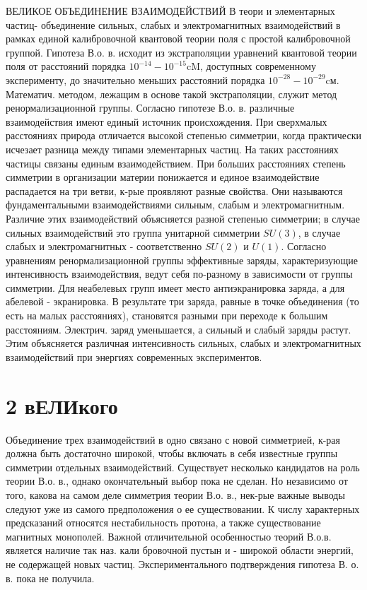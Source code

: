 \documentclass[10pt]{article}
\begin{document}
ВЕЛИКОЕ ОБЪЕДИНЕНИЕ ВЗАИМОДЕЙСТВИЙ В теори и элементарных частиц- объединение сильных, слабых и электромагнитных взаимодействий в рамках единой калибровочной квантовой теории поля с простой калибровочной группой. Гипотеза В.о. в. исходит из экстраполяции уравнений квантовой теории поля от расстояний порядка $10^{-14}-10^{-15} \mathrm{cM}$, доступных современному эксперименту, до значительно меньших расстояний порядка $10^{-28}-10^{-29} \mathrm{cм}$. Математич. методом, лежащим в основе такой экстраполяции, служит метод ренормализационной группы. Согласно гипотезе В.о. в. различные взаимодействия имеют единый источник происхождения. При сверхмалых расстояниях природа отличается высокой степенью симметрии, когда практически исчезает разница между типами элементарных частиц. На таких расстояниях частицы связаны единым взаимодействием. При больших расстояниях степень симметрии в организации материи понижается и единое взаимодействие распадается на три ветви, к-рые проявляют разные свойства. Они называются фундаментальными взаимодействиями сильным, слабым и электромагнитным. Различие этих взаимодействий объясняется разной степенью симметрии; в случае сильных взаимодействий это группа унитарной симметрии $S U(3)$, в случае слабых и электромагнитных - соответственно $S U(2)$ и $U(1)$. Согласно уравнениям ренормализационной группы эффективные заряды, характеризующие интенсивность взаимодействия, ведут себя по-разному в зависимости от группы симметрии. Для неабелевых групп имеет место антиэкранировка заряда, а для абелевой - экранировка. В результате три заряда, равные в точке объединения (то есть на малых расстояниях), становятся разными при переходе к большим расстояниям. Электрич. заряд уменьшается, а сильный и слабый заряды растут. Этим объясняется различная интенсивность сильных, слабых и электромагнитных взаимодействий при энергиях современных экспериментов.



\section{2 вЕЛИкого}

Объединение трех взаимодействий в одно связано с новой симметрией, к-рая должна быть достаточно широкой, чтобы включать в себя известные группы симметрии отдельных взаимодействий. Существует несколько кандидатов на роль теории В.о. в., однако окончательный выбор пока не сделан. Но независимо от того, какова на самом деле симметрия теории В.о. в., нек-рые важные выводы следуют уже из самого предположения о ее существовании. К числу характерных предсказаний относятся нестабильность протона, а также существование магнитных монополей. Важной отличительной особенностью теорий В.о.в. является наличие так наз. кали бровочной пустын и - широкой области энергий, не содержащей новых частиц. Экспериментального подтверждения гипотеза В. о. в. пока не получила.
\end{document}

